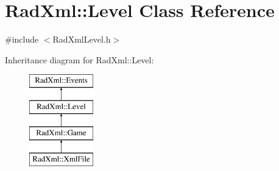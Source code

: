 \hypertarget{class_rad_xml_1_1_level}{\section{Rad\-Xml\-:\-:Level Class Reference}
\label{class_rad_xml_1_1_level}
}


{\ttfamily \#include $<$Rad\-Xml\-Level.\-h$>$}

Inheritance diagram for Rad\-Xml\-:\-:Level\-:\begin{figure}[H]
\begin{center}
\leavevmode
\includegraphics[height=4.000000cm]{class_rad_xml_1_1_level}
\end{center}
\end{figure}
